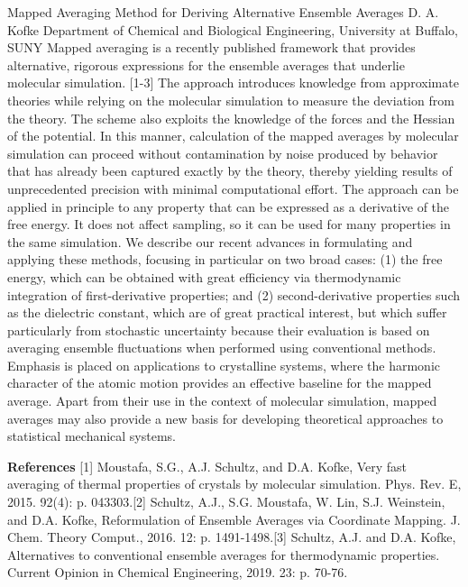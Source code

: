 
    \begin{abstract_online}{Mapped Averaging Method for Deriving Alternative Ensemble Averages}{%
        D. A. Kofke}{%
        \KLtag}{%
        Department of Chemical and Biological Engineering, University at Buffalo, SUNY}
    Mapped averaging is a recently published framework that provides alternative, rigorous expressions for the ensemble averages that underlie molecular simulation. [1-3]  The approach introduces knowledge from approximate theories while relying on the molecular simulation to measure the deviation from the theory. The scheme also exploits the knowledge of the forces and the Hessian of the potential. In this manner, calculation of the mapped averages by molecular simulation can proceed without contamination by noise produced by behavior that has already been captured exactly by the theory, thereby yielding results of unprecedented precision with minimal computational effort. The approach can be applied in principle to any property that can be expressed as a derivative of the free energy. It does not affect sampling, so it can be used for many properties in the same simulation. We describe our recent advances in formulating and applying these methods, focusing in particular on two broad cases: (1) the free energy, which can be obtained with great efficiency via thermodynamic integration of first-derivative properties; and (2) second-derivative properties such as the dielectric constant, which are of great practical interest, but which suffer particularly from stochastic uncertainty because their evaluation is based on averaging ensemble fluctuations when performed using conventional methods. Emphasis is placed on applications to crystalline systems, where the harmonic character of the atomic motion provides an effective baseline for the mapped average. Apart from their use in the context of molecular simulation, mapped averages may also provide a new basis for developing theoretical approaches to statistical mechanical systems. 
    
        \textbf{References} \newline{}[1] Moustafa, S.G., A.J. Schultz, and D.A. Kofke, Very fast averaging of thermal properties of crystals by molecular simulation. Phys. Rev. E, 2015. 92(4): p. 043303.\newline{}[2] Schultz, A.J., S.G. Moustafa, W. Lin, S.J. Weinstein, and D.A. Kofke, Reformulation of Ensemble Averages via Coordinate Mapping. J. Chem. Theory Comput., 2016. 12: p. 1491-1498.\newline{}[3] Schultz, A.J. and D.A. Kofke, Alternatives to conventional ensemble averages for thermodynamic properties. Current Opinion in Chemical Engineering, 2019. 23: p. 70-76.
    \end{abstract_online}
    